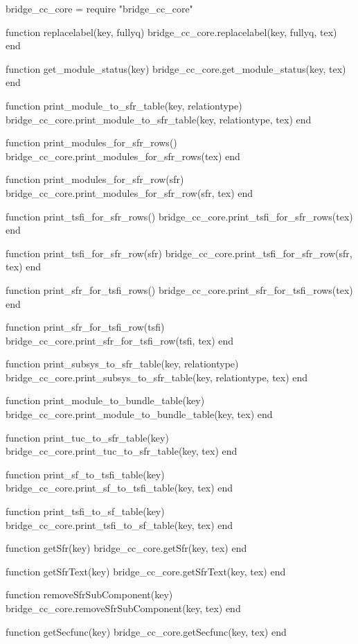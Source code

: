 \begin{luacode}

  bridge_cc_core = require "bridge_cc_core"

  function replacelabel(key, fullyq)
    bridge_cc_core.replacelabel(key, fullyq, tex)
  end

  function get_module_status(key)
    bridge_cc_core.get_module_status(key, tex)
  end

  function print_module_to_sfr_table(key, relationtype)
    bridge_cc_core.print_module_to_sfr_table(key, relationtype, tex)
  end

  function print_modules_for_sfr_rows()
    bridge_cc_core.print_modules_for_sfr_rows(tex)
  end

  function print_modules_for_sfr_row(sfr)
    bridge_cc_core.print_modules_for_sfr_row(sfr, tex)
  end

  function print_tsfi_for_sfr_rows()
    bridge_cc_core.print_tsfi_for_sfr_rows(tex)
  end

  function print_tsfi_for_sfr_row(sfr)
    bridge_cc_core.print_tsfi_for_sfr_row(sfr, tex)
  end

  function print_sfr_for_tsfi_rows()
    bridge_cc_core.print_sfr_for_tsfi_rows(tex)
  end

  function print_sfr_for_tsfi_row(tsfi)
    bridge_cc_core.print_sfr_for_tsfi_row(tsfi, tex)
  end

  function print_subsys_to_sfr_table(key, relationtype)
    bridge_cc_core.print_subsys_to_sfr_table(key, relationtype, tex)
  end

  function print_module_to_bundle_table(key)
    bridge_cc_core.print_module_to_bundle_table(key, tex)
  end

  function print_tuc_to_sfr_table(key)
    bridge_cc_core.print_tuc_to_sfr_table(key, tex)
  end

  function print_sf_to_tsfi_table(key)
    bridge_cc_core.print_sf_to_tsfi_table(key, tex)
  end

  function print_tsfi_to_sf_table(key)
    bridge_cc_core.print_tsfi_to_sf_table(key, tex)
  end

  function getSfr(key)
    bridge_cc_core.getSfr(key, tex)
  end

  function getSfrText(key)
    bridge_cc_core.getSfrText(key, tex)
  end

  function removeSfrSubComponent(key)
    bridge_cc_core.removeSfrSubComponent(key, tex)
  end

  function getSecfunc(key)
    bridge_cc_core.getSecfunc(key, tex)
  end


\end{luacode}
